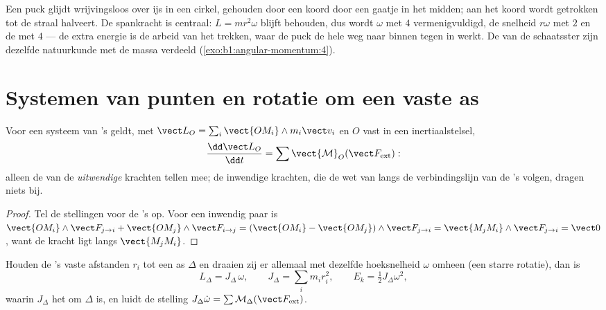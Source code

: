 \begin{example}\label{ex:b1:angular-momentum:puck}
Een puck glijdt wrijvingsloos over ijs in een cirkel, gehouden door een koord door
een gaatje in het midden; aan het koord wordt getrokken tot de straal halveert.
De spankracht is centraal: $L = mr^2\omega$ blijft behouden, dus wordt $\omega$
met $4$ vermenigvuldigd, de snelheid $r\omega$ met $2$ en de  met $4$
--- de extra energie is de arbeid van het trekken, waar de puck de hele weg naar
binnen tegen in werkt. De  van de schaatsster zijn dezelfde natuurkunde met de massa
verdeeld (\cref{exo:b1:angular-momentum:4}).
\end{example}

\section{Systemen van punten en rotatie om een vaste as}

\begin{theorem}\label{thm:b1:angular-momentum:system}
Voor een systeem van 's geldt, met $\vect L_O = \sum_i\vect{OM_i}\wedge m_i\vect v_i$
en $O$ vast in een inertiaalstelsel,
\[
\frac{\dd\vect L_O}{\dd t} = \sum\vect{\mathcal M}_O(\vect F_{\mathrm{ext}}):
\]
alleen de  van de \emph{uitwendige} krachten tellen mee; de inwendige krachten,
die de wet van  langs de verbindingslijn van de
's volgen, dragen niets bij.
\end{theorem}

\begin{proof}
Tel de stellingen voor de 's op. Voor een inwendig paar is $\vect{OM_i}\wedge\vect F_{j\to i}
+ \vect{OM_j}\wedge\vect F_{i\to j} = (\vect{OM_i} - \vect{OM_j})\wedge\vect F_{j\to i}
= \vect{M_jM_i}\wedge\vect F_{j\to i} = \vect 0$, want de kracht ligt langs
$\vect{M_jM_i}$.
\end{proof}

\begin{proposition}\label{prop:b1:angular-momentum:inertia}
Houden de 's vaste afstanden $r_i$ tot een as $\Delta$ en draaien zij
er allemaal met dezelfde hoeksnelheid $\omega$ omheen (een starre rotatie), dan is
\[
L_\Delta = J_\Delta\,\omega, \qquad J_\Delta = \sum_i m_ir_i^2, \qquad
E_k = \tfrac12 J_\Delta\omega^2,
\]
waarin $J_\Delta$ het \emph{} om $\Delta$ is, en luidt de
stelling $J_\Delta\dot\omega = \sum\mathcal M_\Delta(\vect F_{\mathrm{ext}})$.
\end{proposition}

